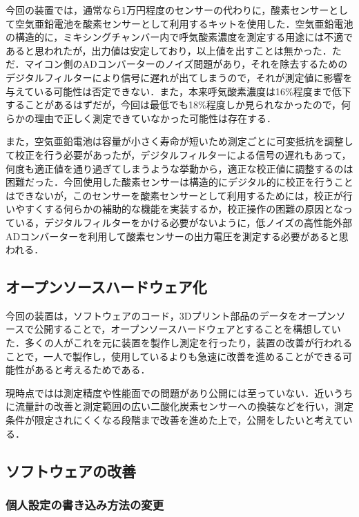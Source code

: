 今回の装置では，通常なら1万円程度のセンサーの代わりに，酸素センサーとして空気亜鉛電池を酸素センサーとして利用するキットを使用した．空気亜鉛電池の構造的に，ミキシングチャンバー内で呼気酸素濃度を測定する用途には不適であると思われたが，出力値は安定しており，以上値を出すことは無かった．ただ．マイコン側のADコンバーターのノイズ問題があり，それを除去するためのデジタルフィルターにより信号に遅れが出てしまうので，それが測定値に影響を与えている可能性は否定できない．また，本来呼気酸素濃度は16\%程度まで低下することがあるはずだが，今回は最低でも18\%程度しか見られなかったので，何らかの理由で正しく測定できていなかった可能性は存在する．

また，空気亜鉛電池は容量が小さく寿命が短いため測定ごとに可変抵抗を調整して校正を行う必要があったが，デジタルフィルターによる信号の遅れもあって，何度も適正値を通り過ぎてしまうような挙動から，適正な校正値に調整するのは困難だった．今回使用した酸素センサーは構造的にデジタル的に校正を行うことはできないが，このセンサーを酸素センサーとして利用するためには，校正が行いやすくする何らかの補助的な機能を実装するか，校正操作の困難の原因となっている，デジタルフィルターをかける必要がないように，低ノイズの高性能外部ADコンバーターを利用して酸素センサーの出力電圧を測定する必要があると思われる．

\subsection{オープンソースハードウェア化}

今回の装置は，ソフトウェアのコード，3Dプリント部品のデータをオープンソースで公開することで，オープンソースハードウェアとすることを構想していた．多くの人がこれを元に装置を製作し測定を行ったり，装置の改善が行われることで，一人で製作し，使用しているよりも急速に改善を進めることができる可能性があると考えるためである．

現時点ではは測定精度や性能面での問題があり公開には至っていない．近いうちに流量計の改善と測定範囲の広い二酸化炭素センサーへの換装などを行い，測定条件が限定されにくくなる段階まで改善を進めた上で，公開をしたいと考えている．

\subsection{ソフトウェアの改善}

\subsubsection{個人設定の書き込み方法の変更}

